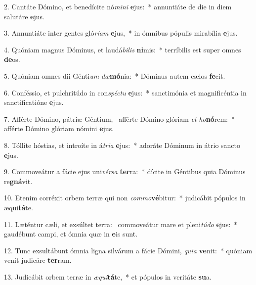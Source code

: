 2. Cantáte Dómino, et benedícite nó\textit{mi}\textit{ni} \textbf{e}jus:~*  annuntiáte de die in diem salutáre \textbf{e}jus.\

3. Annuntiáte inter gentes gló\textit{ri}\textit{am} \textbf{e}jus,~*  in ómnibus pópulis mirabília \textbf{e}jus.\

4. Quóniam magnus Dóminus, et laudá\textit{bi}\textit{lis} \textbf{ni}mis:~*  terríbilis est super omnes \textbf{de}os.\

5. Quóniam omnes dii Génti\textit{um} \textit{dæ}\textbf{mó}nia:~*  Dóminus autem cælos \textbf{fe}cit.\

6. Conféssio, et pulchritúdo in con\textit{spéc}\textit{tu} \textbf{e}jus:~*  sanctimónia et magnificéntia in sanctificatióne \textbf{e}jus.\

7. Afférte Dómino, pátriæ Géntium, \dag\  afférte Dómino glóriam \textit{et} \textit{ho}\textbf{nó}rem:~*  afférte Dómino glóriam nómini \textbf{e}jus.\

8. Tóllite hóstias, et introíte in á\textit{tri}\textit{a} \textbf{e}jus:~*  adoráte Dóminum in átrio sancto \textbf{e}jus.\

9. Commoveátur a fácie ejus uni\textit{vér}\textit{sa} \textbf{ter}ra:~*  dícite in Géntibus quia Dóminus re\textbf{gná}vit.\

10. Etenim corréxit orbem terræ qui non \textit{com}\textit{mo}\textbf{vé}bitur:~*  judicábit pópulos in æqui\textbf{tá}te.\

11. Læténtur cæli, et exsúltet terra: \dag\  commoveátur mare et pleni\textit{tú}\textit{do} \textbf{e}jus:~*  gaudébunt campi, et ómnia quæ in \textbf{e}is sunt.\

12. Tunc exsultábunt ómnia ligna silvárum a fácie Dómini, \textit{qui}\textit{a} \textbf{ve}nit:~*  quóniam venit judicáre \textbf{ter}ram.\

13. Judicábit orbem terræ in \textit{æ}\textit{qui}\textbf{tá}te,~*  et pópulos in veritáte \textbf{su}a.\

